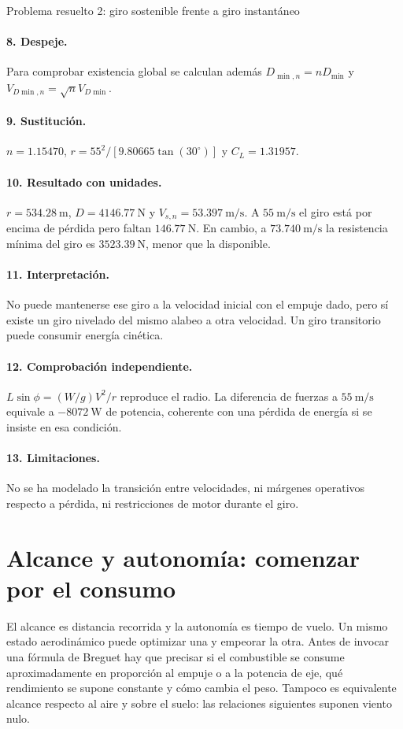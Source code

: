 \begin{studiumworked}{Problema resuelto 2: giro sostenible frente a giro instantáneo}
\paragraph{8. Despeje.} Para comprobar existencia global se calculan además $D_{\min,n}=nD_{\min}$ y $V_{D\min,n}=\sqrt nV_{D\min}$.
\paragraph{9. Sustitución.} $n=1.15470$, $r=55^2/[9.80665\tan(30^\circ)]$ y $C_L=1.31957$.
\paragraph{10. Resultado con unidades.} $r=534.28\ \mathrm m$, $D=4146.77\ \mathrm N$ y $V_{s,n}=53.397\ \mathrm{m/s}$. A $55\ \mathrm{m/s}$ el giro está por encima de pérdida pero faltan $146.77\ \mathrm N$. En cambio, a $73.740\ \mathrm{m/s}$ la resistencia mínima del giro es $3523.39\ \mathrm N$, menor que la disponible.
\paragraph{11. Interpretación.} No puede mantenerse ese giro a la velocidad inicial con el empuje dado, pero sí existe un giro nivelado del mismo alabeo a otra velocidad. Un giro transitorio puede consumir energía cinética.
\paragraph{12. Comprobación independiente.} $L\sin\phi=(W/g)V^2/r$ reproduce el radio. La diferencia de fuerzas a $55\ \mathrm{m/s}$ equivale a $-8072\ \mathrm W$ de potencia, coherente con una pérdida de energía si se insiste en esa condición.
\paragraph{13. Limitaciones.} No se ha modelado la transición entre velocidades, ni márgenes operativos respecto a pérdida, ni restricciones de motor durante el giro.


\end{studiumworked}

\section{Alcance y autonomía: comenzar por el consumo}\label{sec:11-breguet}
El alcance es distancia recorrida y la autonomía es tiempo de vuelo. Un mismo estado aerodinámico puede optimizar una y empeorar la otra. Antes de invocar una fórmula de Breguet hay que precisar si el combustible se consume aproximadamente en proporción al empuje o a la potencia de eje, qué rendimiento se supone constante y cómo cambia el peso. Tampoco es equivalente alcance respecto al aire y sobre el suelo: las relaciones siguientes suponen viento nulo.


